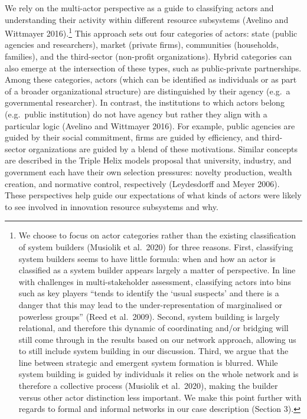 \documentclass[twoside,12pt,final]{ucthesis-CA2012}
\begin{document}
\begin{ucmainmatter}
We rely on the multi-actor perspective as a guide to classifying actors
and understanding their activity within different resource subsystems
(Avelino and Wittmayer 2016).\footnote{We choose to focus on actor categories rather than the existing
  classification of \textquotesingle system builders\textquotesingle{} (Musiolik et al.~2020) for
  three reasons. First, classifying system builders seems to have
  little formula: when and how an actor is classified as a system
  builder appears largely a matter of perspective. In line with
  challenges in multi-stakeholder assessment, classifying actors into
  bins such as key players ``tends to identify the `usual suspects'
  and there is a danger that this may lead to the under-representation
  of marginalised or powerless groups'' (Reed et al.~2009). Second,
  system building is largely relational, and therefore this dynamic of
  coordinating and/or bridging will still come through in the results
  based on our network approach, allowing us to still include system
  building in our discussion. Third, we argue that the line between
  strategic and emergent system formation is blurred. While system
  building is guided by individuals it relies on the whole network and
  is therefore a collective process (Musiolik et al.~2020), making the
  \textquotesingle builder\textquotesingle{} versus \textquotesingle other actor\textquotesingle{} distinction less important. We
  make this point further with regards to formal and informal networks
  in our case description (Section 3).} This approach sets out four categories
of actors: state (public agencies and researchers), market (private
firms), communities (households, families), and the third-sector
(non-profit organizations). Hybrid categories can also emerge at the
intersection of these types, such as public-private partnerships. Among
these categories, actors (which can be identified as individuals or as
part of a broader organizational structure) are distinguished by their
agency (e.g.~a governmental researcher). In contrast, the institutions
to which actors belong (e.g.~public institution) do not have agency but
rather they align with a particular \textquotesingle logic\textquotesingle{} (Avelino and Wittmayer
2016). For example, public agencies are guided by their social
commitment, firms are guided by efficiency, and third-sector
organizations are guided by a blend of these motivations. Similar
concepts are described in the Triple Helix model\textquotesingle s proposal that
university, industry, and government each have their own selection
pressures: novelty production, wealth creation, and normative control,
respectively (Leydesdorff and Meyer 2006). These perspectives help guide
our expectations of what kinds of actors we\textquotesingle re likely to see involved
in innovation resource subsystems and why.


\end{ucmainmatter}
\end{document}
